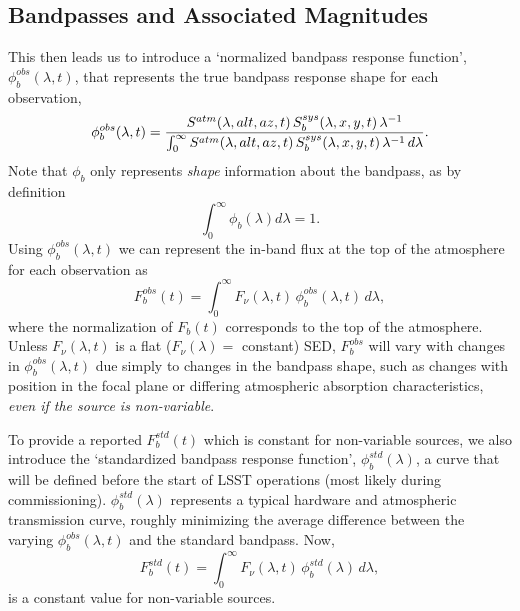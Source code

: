 \documentclass[12pt,preprint]{aastex}
\begin{document}
\subsection{Bandpasses and Associated Magnitudes}
\label{sec:phi}

This then leads us to introduce a `normalized bandpass response
function', $\phi_b^{obs}(\lambda,t)$, that represents the true
bandpass response shape for each observation,
\begin{equation}
\label{eqn:PhiDef}
   \phi_b^{obs}(\lambda,t) =  {
     {S^{atm}(\lambda,alt,az,t)\, S_b^{sys}(\lambda,x,y,t) \,
       \lambda^{-1}} \over
     \int_0^\infty { {S^{atm}(\lambda,alt,az,t) \,
         S_b^{sys}(\lambda,x,y,t) \, \lambda^{-1}} \,d\lambda}}.
\end{equation}
Note that $\phi_b$ only represents {\it shape} information about the
bandpass, as by definition
\begin{equation}
\int_0^\infty {\phi_b(\lambda)  d\lambda}=1. 
\end{equation}
Using $\phi_b^{obs}(\lambda, t)$ we can represent the
in-band flux at the top of the atmosphere for each observation as
\begin{equation}
\label{eqn:Fb}
F_b^{obs}(t) = \int_0^\infty {F_\nu(\lambda,t) \,\phi_b^{obs}(\lambda,t) \, d\lambda},
\end{equation}
where the normalization of $F_b(t)$ corresponds to the top of the
atmosphere. Unless $F_\nu(\lambda,t)$ is a flat ($F_\nu(\lambda)=$
constant) SED, $F_b^{obs}$ will vary with changes in
$\phi_b^{obs}(\lambda,t)$ due simply to changes in the bandpass shape,
such as changes with position in the focal plane or differing
atmospheric absorption characteristics, {\it even if the source is
non-variable}.

To provide a reported $F_b^{std}(t)$ which is constant for
non-variable sources, we also introduce the `standardized bandpass response
function', $\phi_b^{std}(\lambda)$, a curve that will be defined before
the start of LSST operations (most likely during
commissioning). $\phi_b^{std}(\lambda)$ represents a typical hardware
and atmospheric transmission curve, roughly minimizing the average difference between
the varying $\phi_b^{obs}(\lambda,t)$ and the standard bandpass.
Now, 
\begin{equation}
\label{eqn:stdFlux}
F_b^{std}(t) = \int_0^{\infty} {F_\nu(\lambda,t) \,
  \phi_b^{std}(\lambda) \, d\lambda}, 
\end{equation}
is a constant value for non-variable sources. 
\end{document}
